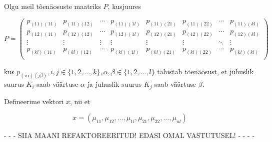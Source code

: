 \documentclass[a4paper,12pt,oneside]{article}
\newenvironment{tightcenter}{%
  \setlength\topsep{0pt}
  \setlength\parskip{0pt}
  \begin{center}
}{%
  \end{center}
}
\numberwithin{equation}{section}
\theoremstyle{definition}
\begin{document}
Olgu meil tõenäosuste maatriks $P$, kusjuures
\begin{tightcenter}
\begin{equation*}
P =
\begin{pmatrix}
p_{(11)(11)}&p_{(11)(12)}&\cdots &p_{(11)(1l)}&p_{(11)(21)}& p_{(11)(22)} & \cdots&p_{(11)(kl)} \\
p_{(12)(11)}&p_{(12)(12)}& \cdots &p_{(12)(1l)} & p_{(12)(21)} & p_{(12)(22)} & \cdots& p_{(12)(kl)} \\
\vdots&\vdots&\vdots&\vdots&\vdots&\vdots&\ddots&\vdots \\
p_{(kl)(11)}&p_{(kl)(12)}&\cdots&p_{(kl)(1l)}&p_{(kl)(21)}& p_{(kl)(22)} &\cdots&p_{(kl)(kl)} \\
\end{pmatrix} 
\end{equation*}
\end{tightcenter}

kus  $p_{(i \alpha) (j \beta)}, i,j \in  \lbrace 1,2,...,k \rbrace, \alpha , \beta \in \lbrace 1,2,\ldots,l \rbrace$ tähistab tõenäosust, et juhuslik suurus $K_i$ saab väärtuse $\alpha$ ja juhuslik suurus $K_j$ saab väärtuse $\beta$. 


Defineerime  vektori $x$, nii et

\begin{tightcenter}
\begin{equation*}
x = (\mu_{11},\mu_{12},\ldots,\mu_{1l},\mu_{21},\mu_{22},\ldots,\mu_{nl})
\end{equation*}
\end{tightcenter}

 {\color{red}- - - SIIA MAANI REFAKTOREERITUD! EDASI OMAL VASTUTUSEL! - - - -} 
\end{document}
